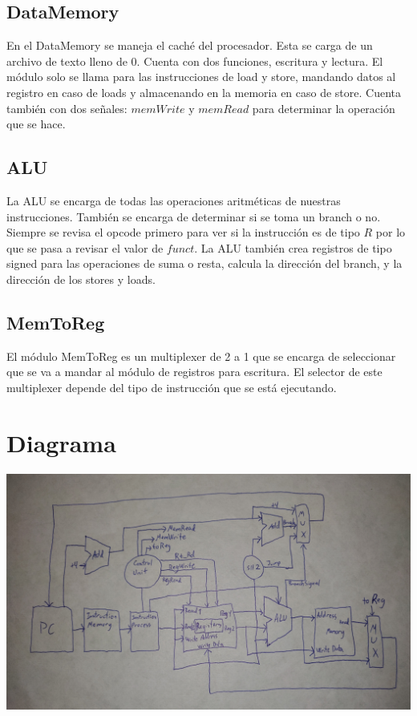 \documentclass[12pt,a4paper]{article}
\begin{document}
\subsection{DataMemory}
\text En el DataMemory se maneja el caché del procesador. Esta se carga de un archivo de texto lleno de 0. Cuenta con dos funciones, escritura y lectura. El módulo solo se llama para las instrucciones de load y store, mandando datos al registro en caso de loads y almacenando en la memoria en caso de store. Cuenta también con dos señales: $memWrite$ y $memRead$ para determinar la operación que se hace.

\subsection{ALU}
\text La ALU se encarga de todas las operaciones aritméticas de nuestras instrucciones. También se encarga de determinar si se toma un branch o no. Siempre se revisa el opcode primero para ver si la instrucción es de tipo $R$ por lo que se pasa a revisar el valor de $funct$. La ALU también crea registros de tipo signed para las operaciones de suma o resta, calcula la dirección del branch, y la dirección de los stores y loads.

\subsection{MemToReg}
\text El módulo MemToReg es un multiplexer de 2 a 1 que se encarga de seleccionar que se va a mandar al módulo de registros para escritura. El selector de este multiplexer depende del tipo de instrucción que se está ejecutando.

\section{Diagrama}

\includegraphics[width=14cm]{./datapath.jpg}
\end{document}
